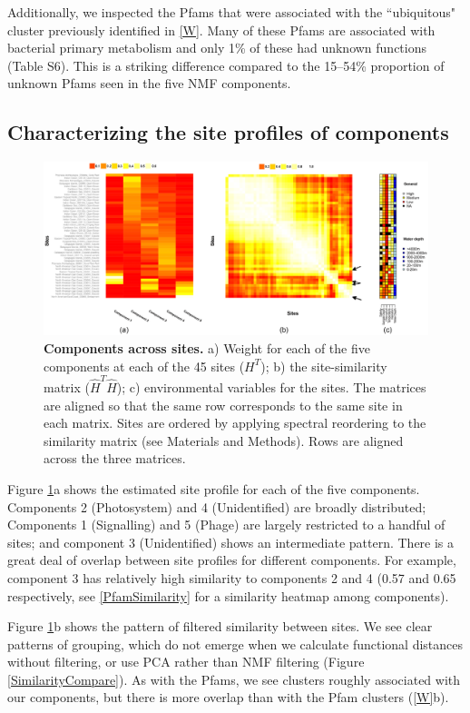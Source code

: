 Additionally, we inspected the Pfams that were associated with the ``ubiquitous" cluster previously identified in \ref{W}. Many of these Pfams are associated with bacterial primary metabolism and only 1\% of these had unknown functions (Table S6). This is a striking difference compared to the 15--54\% proportion of unknown Pfams seen in the five NMF components. 

\subsection{Characterizing the site profiles of components}

\begin{figure}
\centering
\includegraphics[width=\textwidth]{NMF/figures/fig3}
\caption{\textbf{Components across sites.} a) Weight for each of the five components at each of the 45 sites ($H^T$);  b) the site-similarity matrix ($\hat H^T \hat H$); c) environmental variables for the sites.  The matrices are aligned so that the same row corresponds to the same site in each matrix.  Sites are ordered by applying spectral reordering to the similarity matrix (see Materials and Methods). Rows are aligned across the three matrices.}
\label{H} 
\end{figure}

Figure \ref{H}a shows the estimated site profile for each of the five components.  Components 2 (Photosystem) and 4 (Unidentified) are broadly distributed;  Components 1 (Signalling) and 5 (Phage) are largely restricted to a handful of sites; and component 3 (Unidentified) shows an intermediate pattern.  There is a great deal of overlap between site profiles for different components. For example, component 3 has relatively high similarity to components 2 and 4 (0.57 and 0.65 respectively, see \ref{PfamSimilarity} for a similarity heatmap among components).  

Figure \ref{H}b shows the pattern of filtered similarity between sites.  We see clear patterns of grouping, which do not emerge when we calculate functional distances without filtering, or use PCA rather than NMF filtering (Figure \ref{SimilarityCompare}). As with the Pfams, we see clusters roughly associated with our components, but there is more overlap than with the Pfam clusters (\ref{W}b).

